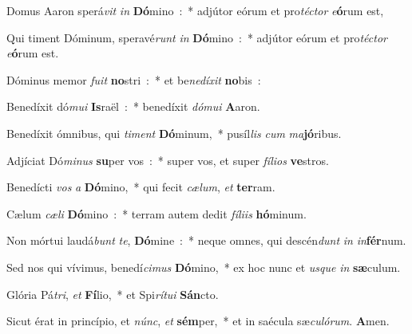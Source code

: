 \item Domus Aaron sperá\emph{vit} \emph{in} \textbf{Dó}\-mino~:~* adjútor eórum et pro\emph{té}\-\emph{ctor} \emph{e}\-\textbf{ó}\-rum est,
\item Qui timent Dóminum, speravé\emph{runt} \emph{in} \textbf{Dó}\-mino~:~* adjútor eórum et pro\emph{té}\-\emph{ctor} \emph{e}\-\textbf{ó}\-rum est.
\item Dóminus memor \emph{fu}\-\emph{it} \textbf{no}\-stri~:~* et be\emph{ne}\-\emph{dí}\-\emph{xit} \textbf{no}bis~:
\item Benedíxit dó\emph{mu}\-\emph{i} \textbf{Is}\-raël~:~* benedíxit \emph{dó}\-\emph{mu}\-\emph{i} \textbf{A}aron.
\item Benedíxit ómnibus, qui \emph{ti}\-\emph{ment} \textbf{Dó}\-minum,~* pu\-síl\-\emph{lis} \emph{cum} \emph{ma}\textbf{jó}ribus.
\item Adjíciat Dó\emph{mi}\-\emph{nus} \textbf{su}\-per vos~:~* super vos, et super \emph{fí}\-\emph{li}\-\emph{os} \textbf{ve}stros.
\item Benedícti \emph{vos} \emph{a} \textbf{Dó}\-mino,~* qui fecit \emph{cæ}\-\emph{lum}, \emph{et} \textbf{ter}ram.
\item Cælum \emph{cæ}\-\emph{li} \textbf{Dó}\-mino~:~* terram autem dedit \emph{fí}\-\emph{li}\-\emph{is} \textbf{hó}minum.
\item Non mórtui laudá\emph{bunt} \emph{te}, \textbf{Dó}\-mine~:~* neque omnes, qui descén\emph{dunt} \emph{in} \emph{in}\textbf{fér}num.
\item Sed nos qui vívimus, benedí\emph{ci}\-\emph{mus} \textbf{Dó}\-mino,~* ex hoc nunc et \emph{us}\-\emph{que} \emph{in} \textbf{sæ}culum.
\item Glória Pá\emph{tri}, \emph{et} \textbf{Fí}\-lio,~* et Spi\emph{rí}\-\emph{tu}\-\emph{i} \textbf{Sán}cto.
\item Sicut érat in princípio, et \emph{núnc}, \emph{et} \textbf{sém}\-per,~* et in saécula sæ\emph{cu}\-\emph{ló}\-\emph{rum}. \textbf{A}men.
